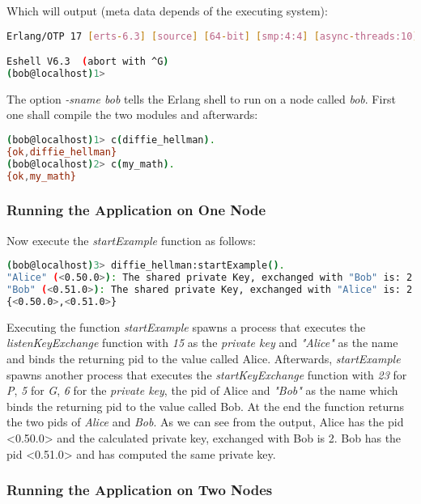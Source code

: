 \documentclass[xcolor=dvipsnames]{article}
\begin{document}
\noindent Which will output (meta data depends of the executing system):

\begin{lstlisting}[language=bash]
Erlang/OTP 17 [erts-6.3] [source] [64-bit] [smp:4:4] [async-threads:10] [hipe] [kernel-poll:false]

Eshell V6.3  (abort with ^G)
(bob@localhost)1> 
\end{lstlisting}

\noindent The option \textit{-sname bob} tells the Erlang shell to run on a node called \textit{bob}. First one shall compile the two modules and afterwards:

\begin{lstlisting}[language=bash]
(bob@localhost)1> c(diffie_hellman).
{ok,diffie_hellman}
(bob@localhost)2> c(my_math).
{ok,my_math}
\end{lstlisting}

\subsubsection{Running the Application on One Node}

Now execute the \textit{startExample} function as follows:

\begin{lstlisting}[language=bash]
(bob@localhost)3> diffie_hellman:startExample().
"Alice" (<0.50.0>): The shared private Key, exchanged with "Bob" is: 2
"Bob" (<0.51.0>): The shared private Key, exchanged with "Alice" is: 2
{<0.50.0>,<0.51.0>}
\end{lstlisting}

\noindent Executing the function \textit{startExample} spawns a process that executes the \textit{listenKeyExchange} function with \textit{15} as the \textit{private key} and \textit{"Alice"} as the name and binds the returning \gls{pid} to the value called Alice. Afterwards, \textit{startExample} spawns another process that executes the \textit{startKeyExchange} function with \textit{23} for \textit{P}, \textit{5} for \textit{G}, \textit{6} for the \textit{private key}, the \gls{pid} of Alice and \textit{"Bob"} as the name which binds the returning \gls{pid} to the value called Bob. At the end the function returns the two pids of \textit{Alice} and \textit{Bob}. As we can see from the output, Alice has the \gls{pid} <0.50.0> and the calculated private key, exchanged with Bob is 2. Bob has the \gls{pid} <0.51.0> and has computed the same private key.

\subsubsection{Running the Application on Two Nodes}
\end{document}
